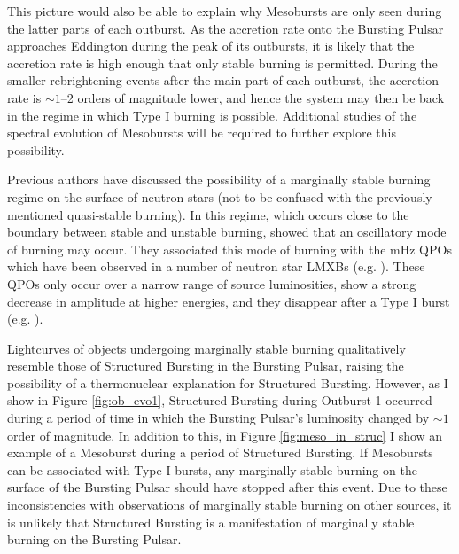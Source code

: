 \par This picture would also be able to explain why Mesobursts are only seen during the latter parts of each outburst.  As the accretion rate onto the Bursting Pulsar approaches Eddington during the peak of its outbursts, it is likely that the accretion rate is high enough that only stable burning is permitted.  During the smaller rebrightening events after the main part of each outburst, the accretion rate is $\sim1$--2 orders of magnitude lower, and hence the system may then be back in the regime in which Type I burning is possible.  Additional studies of the spectral evolution of Mesobursts will be required to further explore this possibility.
\par Previous authors have discussed the possibility of a marginally stable burning regime on the surface of neutron stars (not to be confused with the previously mentioned quasi-stable burning).  In this regime, which occurs close to the boundary between stable and unstable burning, \citet{Heger_MargStab} showed that an oscillatory mode of burning may occur.  They associated this mode of burning with the mHz QPOs which have been observed in a number of neutron star LMXBs (e.g. \citealp{Revnivtsev_MargStab,Altamirano_MargStab}).  These QPOs only occur over a narrow range of source luminosities, show a strong decrease in amplitude at higher energies, and they disappear after a Type I burst (e.g. \citealp{Altamirano_MargStab}).
\par Lightcurves of objects undergoing marginally stable burning qualitatively resemble those of Structured Bursting in the Bursting Pulsar, raising the possibility of a thermonuclear explanation for Structured Bursting.  However, as I show in Figure \ref{fig:ob_evo1}, Structured Bursting during Outburst 1 occurred during a period of time in which the Bursting Pulsar's luminosity changed by $\sim1$ order of magnitude.  In addition to this, in Figure \ref{fig:meso_in_struc} I show an example of a Mesoburst during a period of Structured Bursting.  If Mesobursts can be associated with Type I bursts, any marginally stable burning on the surface of the Bursting Pulsar should have stopped after this event.  Due to these inconsistencies with observations of marginally stable burning on other sources, it is unlikely that Structured Bursting is a manifestation of marginally stable burning on the Bursting Pulsar.
